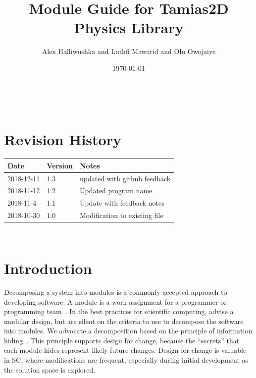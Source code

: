 \documentclass[12pt]{article}
\begin{document}
\title{Module Guide for Tamias2D Physics Library} 
\author{Alex Halliwushka and Luthfi Mawarid and Olu Owojaiye}
\date{\today}
	
\maketitle

~\newpage


\section{Revision History}

\begin{tabularx}{\textwidth}{p{3cm}p{2cm}X}
\toprule {\bf Date} & {\bf Version} & {\bf Notes}\\
\midrule
2018-12-11 & 1.3 & updated with github feedback\\
2018-11-12 & 1.2 & Updated program name\\
2018-11-4 & 1.1 & Update with feedback notes\\
2018-10-30 & 1.0 & Modification to existing file\\
\bottomrule
\end{tabularx}

~\newpage

\tableofcontents

\listoftables

\listoffigures

\newpage


\section{Introduction}

Decomposing a system into modules is a commonly accepted approach to developing
software.  A module is a work assignment for a programmer or programming
team~\citep{ParnasEtAl1984}.  In the best practices for scientific computing,
\citet{WilsonEtAl2013} advise a modular design, but are silent on the criteria
to use to decompose the software into modules.  We advocate a decomposition
based on the principle of information hiding~\citep{Parnas1972a}. This principle
supports design for change, because the ``secrets'' that each module hides
represent likely future changes.  Design for change is valuable in SC, where
modifications are frequent, especially during initial development as the
solution space is explored.
\end{document}
